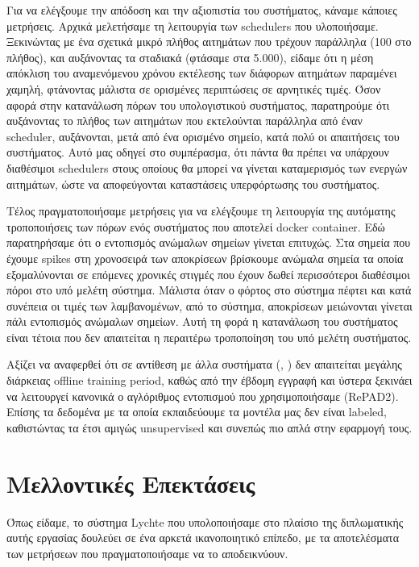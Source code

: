 Για να ελέγξουμε την απόδοση και την αξιοπιστία του συστήματος, κάναμε κάποιες μετρήσεις. Αρχικά μελετήσαμε τη λειτουργία των schedulers που υλοποιήσαμε. Ξεκινώντας με ένα σχετικά μικρό πλήθος αιτημάτων που τρέχουν παράλληλα (100 στο πλήθος), και αυξάνοντας
τα σταδιακά (φτάσαμε στα 5.000), είδαμε ότι η μέση απόκλιση του αναμενόμενου χρόνου εκτέλεσης των διάφορων αιτημάτων παραμένει χαμηλή, φτάνοντας μάλιστα
σε ορισμένες περιπτώσεις σε αρνητικές τιμές. Όσον αφορά στην κατανάλωση πόρων του υπολογιστικού συστήματος, παρατηρούμε ότι
αυξάνοντας το πλήθος των αιτημάτων που εκτελούνται παράλληλα από έναν scheduler, αυξάνονται, μετά από ένα ορισμένο σημείο, κατά πολύ οι απαιτήσεις του
συστήματος. Αυτό μας οδηγεί στο συμπέρασμα, ότι πάντα θα πρέπει να υπάρχουν διαθέσιμοι schedulers στους οποίους θα
μπορεί να γίνεται καταμερισμός των ενεργών αιτημάτων, ώστε να αποφεύγονται καταστάσεις υπερφόρτωσης του συστήματος.  

Τέλος πραγματοποιήσαμε μετρήσεις για να ελέγξουμε τη λειτουργία της αυτόματης τροποποιήσεις των πόρων ενός συστήματος που αποτελεί docker container. Εδώ παρατηρήσαμε ότι ο εντοπισμός ανώμαλων σημείων γίνεται επιτυχώς. Στα σημεία που έχουμε spikes στη χρονοσειρά των αποκρίσεων βρίσκουμε ανώμαλα σημεία τα οποία εξομαλύνονται σε επόμενες χρονικές στιγμές που έχουν δωθεί περισσότεροι διαθέσιμοι πόροι στο υπό μελέτη σύστημα. Μάλιστα όταν ο φόρτος στο σύστημα πέφτει και κατά συνέπεια οι τιμές των λαμβανομένων, από το σύστημα, αποκρίσεων μειώνονται γίνεται πάλι εντοπισμός ανώμαλων σημείων. Αυτή τη φορά η κατανάλωση του συστήματος είναι τέτοια που δεν απαιτείται η περαιτέρω τροποποίηση του υπό μελέτη συστήματος.

Αξίζει να αναφερθεί ότι σε αντίθεση με άλλα συστήματα (\cite{sinan}, \cite{reclaimer}) δεν απαιτείται μεγάλης διάρκειας offline training period, καθώς από την έβδομη εγγραφή και ύστερα ξεκινάει να λειτουργεί κανονικά ο αγλόριθμος εντοπισμού που χρησιμοποιήσαμε (RePAD2). Επίσης τα δεδομένα με τα οποία εκπαιδεύουμε τα μοντέλα μας δεν είναι labeled, καθιστώντας τα έτσι αμιγώς unsupervised και συνεπώς πιο απλά στην εφαρμογή τους.

\section{Μελλοντικές Επεκτάσεις}
\label{section:future_stuff}

Όπως είδαμε, το σύστημα Lychte που υπολοποιήσαμε στο πλαίσιο της διπλωματικής αυτής
εργασίας δουλεύει σε ένα αρκετά ικανοποιητικό επίπεδο, με τα αποτελέσματα των μετρήσεων που πραγματοποιήσαμε να το αποδεικνύουν.

